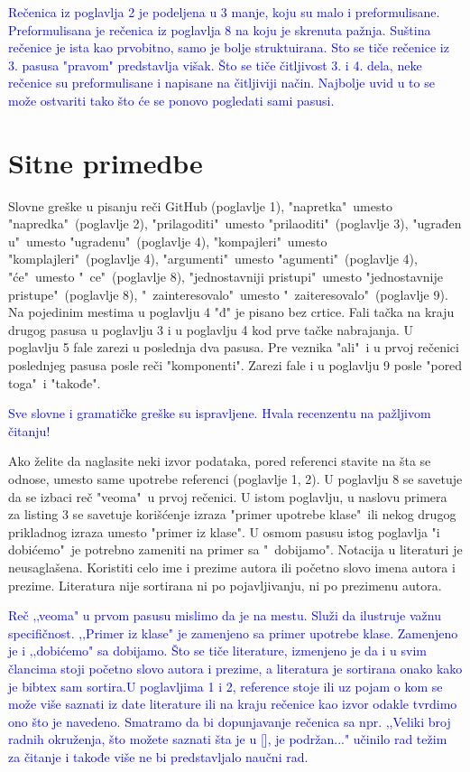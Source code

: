 \documentclass[a4paper]{report}
\newcommand{\odgovor}[1]{\textcolor{blue}{#1}}
\begin{document}
\odgovor{Rečenica iz poglavlja 2 je podeljena u 3 manje, koju su malo i preformulisane. Preformulisana je rečenica iz poglavlja 8 na koju je skrenuta pažnja. Suština rečenice je ista kao prvobitno, samo je bolje struktuirana. Sto se tiče rečenice iz 3. pasusa "pravom" predstavlja višak. Što se tiče čitljivost 3. i 4. dela, neke rečenice su preformulisane i napisane na čitljiviji način. Najbolje uvid u to se može ostvariti tako što će se ponovo pogledati sami pasusi.}

\section{Sitne primedbe}
Slovne greške u pisanju reči GitHub (poglavlje 1), "napretka"\ umesto "napredka"\ (poglavlje 2), "prilagoditi"\ umesto "prilaoditi"\ (poglavlje 3), "ugrađen u"\ umesto "ugradenu"\ (poglavlje 4), "kompajleri"\ umesto "komplajleri"\ (poglavlje 4), "argumenti"\ umesto "agumenti"\ (poglavlje 4), "će"\ umesto "\ ce"\ (poglavlje 8), "jednostavniji pristupi"\ umesto "jednostavnije pristupe"\ (poglavlje 8), "\ zainteresovalo"\ umesto "\ zaiteresovalo"\ (poglavlje 9). Na pojedinim mestima u poglavlju 4 "đ" je pisano bez crtice. Fali tačka na kraju drugog pasusa u poglavlju 3 i u poglavlju 4 kod prve tačke nabrajanja. U poglavlju 5 fale zarezi u poslednja dva pasusa. Pre veznika "ali"\ i u prvoj rečenici poslednjeg pasusa posle reči "komponenti". Zarezi fale i u poglavlju 9 posle "pored toga"\ i "takođe".

\odgovor{Sve slovne i gramatičke greške su ispravljene. Hvala recenzentu na pažljivom čitanju!}

Ako želite da naglasite neki izvor podataka, pored referenci stavite na šta se odnose, umesto same upotrebe referenci (poglavlje 1, 2). U poglavlju 8 se savetuje da se izbaci reč "veoma"\ u prvoj rečenici. U istom poglavlju, u naslovu primera za listing 3 se savetuje korišćenje izraza "primer upotrebe klase"\ ili nekog drugog prikladnog izraza umesto "primer iz klase". U osmom pasusu istog poglavlja "i dobićemo"\ je potrebno zameniti na primer sa "\ dobijamo".
Notacija u literaturi je neusaglašena. Koristiti celo ime i prezime autora ili početno slovo imena autora i prezime. Literatura nije sortirana ni po pojavljivanju, ni po prezimenu autora.

\odgovor{Reč ‚‚veoma" u prvom pasusu mislimo da je na mestu. Služi da ilustruje važnu specifičnost. ‚‚Primer iz klase" je zamenjeno sa
primer upotrebe klase. Zamenjeno je i ‚‚dobićemo" sa dobijamo.
Što se tiče literature, izmenjeno je da i u svim člancima stoji početno slovo autora i prezime, a literatura je sortirana onako kako je bibtex sam sortira.U poglavljima 1 i 2, reference stoje ili uz pojam o kom se može više saznati iz date literature ili na kraju rečenice kao izvor odakle tvrdimo ono što je navedeno. Smatramo da bi dopunjavanje rečenica sa npr. ,,Veliki broj radnih okruženja, što možete saznati šta je u [], je podržan..." učinilo rad težim za čitanje i takođe više ne bi predstavljalo naučni rad.}
\end{document}
